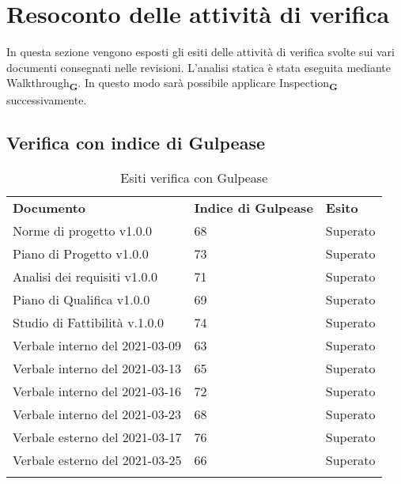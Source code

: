 \section{Resoconto delle attività di verifica}
In questa sezione vengono esposti gli esiti delle attivit\`a di verifica svolte sui vari documenti consegnati nelle revisioni.
L'analisi statica \`e stata eseguita mediante Walkthrough\textsubscript{\textbf{G}}. In questo modo sarà possibile applicare Inspection\textsubscript{\textbf{G}} successivamente.
\subsection{Verifica con indice di Gulpease}
\begin{center}
    \centering

    \renewcommand{\arraystretch}{1.8}
    \label{tab:IndiciGulpease}
    \begin{longtable}[!h]{p{150px} p{50px} p{50px}}
        \caption{Esiti verifica con Gulpease} \\
        \rowcolor{logo!70}   \textbf{Documento} & \textbf{Indice di Gulpease} & \textbf{Esito} \\
        Norme di progetto v1.0.0            & 68 & Superato \\
        Piano di Progetto v1.0.0            & 73& Superato \\
        Analisi dei requisiti v1.0.0        & 71& Superato \\
        Piano di Qualifica v1.0.0           & 69& Superato \\
        Studio di Fattibilità v.1.0.0       & 74& Superato \\
        Verbale interno del 2021-03-09      & 63& Superato \\
        Verbale interno del 2021-03-13      & 65& Superato \\
        Verbale interno del 2021-03-16      & 72& Superato \\
        Verbale interno del 2021-03-23      & 68& Superato \\
        Verbale esterno del 2021-03-17      & 76& Superato \\
        Verbale esterno del 2021-03-25      & 66& Superato \\
    \rowcolor{white}           
    \end{longtable}    
\end{center}
